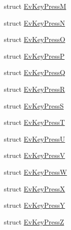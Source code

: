 \begin{DoxyCompactItemize}
\item 
struct \hyperlink{structsm__three__some_1_1keyboard__client_1_1EvKeyPressM}{Ev\+Key\+PressM}
\item 
struct \hyperlink{structsm__three__some_1_1keyboard__client_1_1EvKeyPressN}{Ev\+Key\+PressN}
\item 
struct \hyperlink{structsm__three__some_1_1keyboard__client_1_1EvKeyPressO}{Ev\+Key\+PressO}
\item 
struct \hyperlink{structsm__three__some_1_1keyboard__client_1_1EvKeyPressP}{Ev\+Key\+PressP}
\item 
struct \hyperlink{structsm__three__some_1_1keyboard__client_1_1EvKeyPressQ}{Ev\+Key\+PressQ}
\item 
struct \hyperlink{structsm__three__some_1_1keyboard__client_1_1EvKeyPressR}{Ev\+Key\+PressR}
\item 
struct \hyperlink{structsm__three__some_1_1keyboard__client_1_1EvKeyPressS}{Ev\+Key\+PressS}
\item 
struct \hyperlink{structsm__three__some_1_1keyboard__client_1_1EvKeyPressT}{Ev\+Key\+PressT}
\item 
struct \hyperlink{structsm__three__some_1_1keyboard__client_1_1EvKeyPressU}{Ev\+Key\+PressU}
\item 
struct \hyperlink{structsm__three__some_1_1keyboard__client_1_1EvKeyPressV}{Ev\+Key\+PressV}
\item 
struct \hyperlink{structsm__three__some_1_1keyboard__client_1_1EvKeyPressW}{Ev\+Key\+PressW}
\item 
struct \hyperlink{structsm__three__some_1_1keyboard__client_1_1EvKeyPressX}{Ev\+Key\+PressX}
\item 
struct \hyperlink{structsm__three__some_1_1keyboard__client_1_1EvKeyPressY}{Ev\+Key\+PressY}
\item 
struct \hyperlink{structsm__three__some_1_1keyboard__client_1_1EvKeyPressZ}{Ev\+Key\+PressZ}
\end{DoxyCompactItemize}
